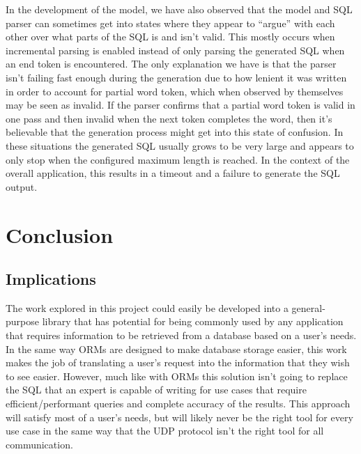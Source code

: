 \documentclass[11pt]{article}
\begin{document}
In the development of the model, we have also observed that the model and SQL parser can sometimes get into states where they appear to ``argue'' with each other over what parts of the SQL is and isn't valid. This mostly occurs when incremental parsing is enabled instead of only parsing the generated SQL when an end token is encountered. The only explanation we have is that the parser isn't failing fast enough during the generation due to how lenient it was written in order to account for partial word token, which when observed by themselves may be seen as invalid. If the parser confirms that a partial word token is valid in one pass and then invalid when the next token completes the word, then it's believable that the generation process might get into this state of confusion. In these situations the generated SQL usually grows to be very large and appears to only stop when the configured maximum length is reached. In the context of the overall application, this results in a timeout and a failure to generate the SQL output.







\section{Conclusion}


\subsection{Implications}



The work explored in this project could easily be developed into a general-purpose library that has potential for being commonly used by any application that requires information to be retrieved from a database based on a user's needs. In the same way ORMs are designed to make database storage easier, this work makes the job of translating a user's request into the information that they wish to see easier. However, much like with ORMs this solution isn't going to replace the SQL that an expert is capable of writing for use cases that require efficient/performant queries and complete accuracy of the results. This approach will satisfy most of a user's needs, but will likely never be the right tool for every use case in the same way that the UDP protocol isn't the right tool for all communication.
\end{document}
